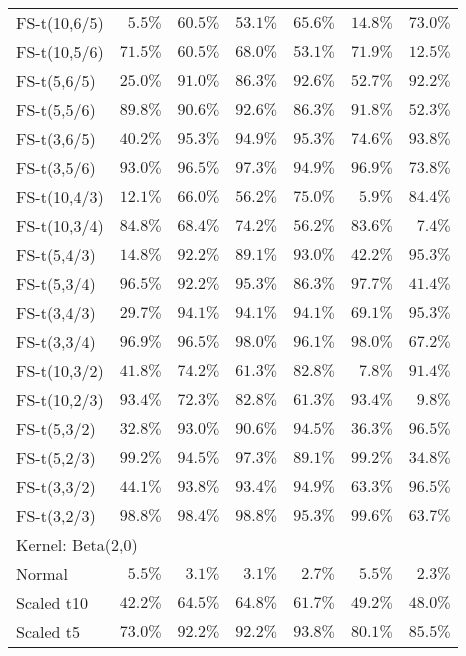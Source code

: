 \begin{longtable}{lrrrrrr}
FS-t(10,6/5) & $5.5\%$ & $60.5\%$ & $53.1\%$ & $65.6\%$ & $14.8\%$ & $73.0\%$ \\ 
FS-t(10,5/6) & $71.5\%$ & $60.5\%$ & $68.0\%$ & $53.1\%$ & $71.9\%$ & $12.5\%$ \\ 
FS-t(5,6/5) & $25.0\%$ & $91.0\%$ & $86.3\%$ & $92.6\%$ & $52.7\%$ & $92.2\%$ \\ 
FS-t(5,5/6) & $89.8\%$ & $90.6\%$ & $92.6\%$ & $86.3\%$ & $91.8\%$ & $52.3\%$ \\ 
FS-t(3,6/5) & $40.2\%$ & $95.3\%$ & $94.9\%$ & $95.3\%$ & $74.6\%$ & $93.8\%$ \\ 
FS-t(3,5/6) & $93.0\%$ & $96.5\%$ & $97.3\%$ & $94.9\%$ & $96.9\%$ & $73.8\%$ \\ 
FS-t(10,4/3) & $12.1\%$ & $66.0\%$ & $56.2\%$ & $75.0\%$ & $5.9\%$ & $84.4\%$ \\ 
FS-t(10,3/4) & $84.8\%$ & $68.4\%$ & $74.2\%$ & $56.2\%$ & $83.6\%$ & $7.4\%$ \\ 
FS-t(5,4/3) & $14.8\%$ & $92.2\%$ & $89.1\%$ & $93.0\%$ & $42.2\%$ & $95.3\%$ \\ 
FS-t(5,3/4) & $96.5\%$ & $92.2\%$ & $95.3\%$ & $86.3\%$ & $97.7\%$ & $41.4\%$ \\ 
FS-t(3,4/3) & $29.7\%$ & $94.1\%$ & $94.1\%$ & $94.1\%$ & $69.1\%$ & $95.3\%$ \\ 
FS-t(3,3/4) & $96.9\%$ & $96.5\%$ & $98.0\%$ & $96.1\%$ & $98.0\%$ & $67.2\%$ \\ 
FS-t(10,3/2) & $41.8\%$ & $74.2\%$ & $61.3\%$ & $82.8\%$ & $7.8\%$ & $91.4\%$ \\ 
FS-t(10,2/3) & $93.4\%$ & $72.3\%$ & $82.8\%$ & $61.3\%$ & $93.4\%$ & $9.8\%$ \\ 
FS-t(5,3/2) & $32.8\%$ & $93.0\%$ & $90.6\%$ & $94.5\%$ & $36.3\%$ & $96.5\%$ \\ 
FS-t(5,2/3) & $99.2\%$ & $94.5\%$ & $97.3\%$ & $89.1\%$ & $99.2\%$ & $34.8\%$ \\ 
FS-t(3,3/2) & $44.1\%$ & $93.8\%$ & $93.4\%$ & $94.9\%$ & $63.3\%$ & $96.5\%$ \\ 
FS-t(3,2/3) & $98.8\%$ & $98.4\%$ & $98.8\%$ & $95.3\%$ & $99.6\%$ & $63.7\%$ \\ 
\midrule
\multicolumn{7}{l}{Kernel: Beta(2,0)} \\ 
\midrule
Normal & $5.5\%$ & $3.1\%$ & $3.1\%$ & $2.7\%$ & $5.5\%$ & $2.3\%$ \\ 
Scaled t10 & $42.2\%$ & $64.5\%$ & $64.8\%$ & $61.7\%$ & $49.2\%$ & $48.0\%$ \\ 
Scaled t5 & $73.0\%$ & $92.2\%$ & $92.2\%$ & $93.8\%$ & $80.1\%$ & $85.5\%$ \\ 

\end{longtable}
